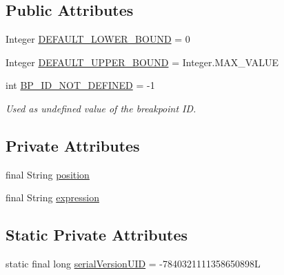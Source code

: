 \subsection*{Public Attributes}
\begin{DoxyCompactItemize}
\item 
Integer \hyperlink{interfacegov_1_1nasa_1_1jpf_1_1inspector_1_1interfaces_1_1_break_point_creation_information_a40131b93f82a84ed5322c4dc5ca4175e}{D\+E\+F\+A\+U\+L\+T\+\_\+\+L\+O\+W\+E\+R\+\_\+\+B\+O\+U\+ND} = 0
\item 
Integer \hyperlink{interfacegov_1_1nasa_1_1jpf_1_1inspector_1_1interfaces_1_1_break_point_creation_information_af917e7de77b2a6fc93c24e1c5a4a5759}{D\+E\+F\+A\+U\+L\+T\+\_\+\+U\+P\+P\+E\+R\+\_\+\+B\+O\+U\+ND} = Integer.\+M\+A\+X\+\_\+\+V\+A\+L\+UE
\item 
int \hyperlink{interfacegov_1_1nasa_1_1jpf_1_1inspector_1_1interfaces_1_1_break_point_creation_information_a24626231e3744e59f505d0731d4ca9e1}{B\+P\+\_\+\+I\+D\+\_\+\+N\+O\+T\+\_\+\+D\+E\+F\+I\+N\+ED} = -\/1
\begin{DoxyCompactList}\small\item\em Used as undefined value of the breakpoint ID. \end{DoxyCompactList}\end{DoxyCompactItemize}
\subsection*{Private Attributes}
\begin{DoxyCompactItemize}
\item 
final String \hyperlink{classgov_1_1nasa_1_1jpf_1_1inspector_1_1client_1_1commands_1_1_cmd_assertions_breakpoint_1_1_console_assertion_creator_a30a32733d7d06276c1370a058a598dd0}{position}
\item 
final String \hyperlink{classgov_1_1nasa_1_1jpf_1_1inspector_1_1client_1_1commands_1_1_cmd_assertions_breakpoint_1_1_console_assertion_creator_a05aeb828189451e21f6022b446326e0c}{expression}
\end{DoxyCompactItemize}
\subsection*{Static Private Attributes}
\begin{DoxyCompactItemize}
\item 
static final long \hyperlink{classgov_1_1nasa_1_1jpf_1_1inspector_1_1client_1_1commands_1_1_cmd_assertions_breakpoint_1_1_console_assertion_creator_a1620c14731f6a028e7f26164bdc6092a}{serial\+Version\+U\+ID} = -\/7840321111358650898L
\end{DoxyCompactItemize}


